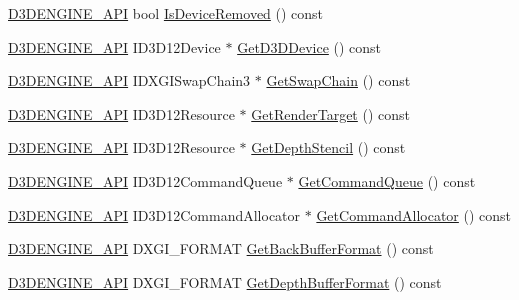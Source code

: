 \begin{DoxyCompactItemize}
\item 
\mbox{\hyperlink{stdafx_8h_a8ee2d990c5dfba7794dd2b60741d7722}{D3\+D\+E\+N\+G\+I\+N\+E\+\_\+\+A\+PI}} bool \mbox{\hyperlink{class_d_x_1_1_device_resources_ac6034a7660faea0d269dbb0d325cb7cd}{Is\+Device\+Removed}} () const
\item 
\mbox{\hyperlink{stdafx_8h_a8ee2d990c5dfba7794dd2b60741d7722}{D3\+D\+E\+N\+G\+I\+N\+E\+\_\+\+A\+PI}} I\+D3\+D12\+Device $\ast$ \mbox{\hyperlink{class_d_x_1_1_device_resources_ab453c5634e7cd987bee4a1819b78122a}{Get\+D3\+D\+Device}} () const
\item 
\mbox{\hyperlink{stdafx_8h_a8ee2d990c5dfba7794dd2b60741d7722}{D3\+D\+E\+N\+G\+I\+N\+E\+\_\+\+A\+PI}} I\+D\+X\+G\+I\+Swap\+Chain3 $\ast$ \mbox{\hyperlink{class_d_x_1_1_device_resources_a7a96c1ac092f671997e17f9078c409e3}{Get\+Swap\+Chain}} () const
\item 
\mbox{\hyperlink{stdafx_8h_a8ee2d990c5dfba7794dd2b60741d7722}{D3\+D\+E\+N\+G\+I\+N\+E\+\_\+\+A\+PI}} I\+D3\+D12\+Resource $\ast$ \mbox{\hyperlink{class_d_x_1_1_device_resources_a8dd65cfba90dd43be6b43328985d6f75}{Get\+Render\+Target}} () const
\item 
\mbox{\hyperlink{stdafx_8h_a8ee2d990c5dfba7794dd2b60741d7722}{D3\+D\+E\+N\+G\+I\+N\+E\+\_\+\+A\+PI}} I\+D3\+D12\+Resource $\ast$ \mbox{\hyperlink{class_d_x_1_1_device_resources_abb849df3775f377ef3e3625b5b43fa5b}{Get\+Depth\+Stencil}} () const
\item 
\mbox{\hyperlink{stdafx_8h_a8ee2d990c5dfba7794dd2b60741d7722}{D3\+D\+E\+N\+G\+I\+N\+E\+\_\+\+A\+PI}} I\+D3\+D12\+Command\+Queue $\ast$ \mbox{\hyperlink{class_d_x_1_1_device_resources_adabcf266dec101a537eebbce5f74cfdd}{Get\+Command\+Queue}} () const
\item 
\mbox{\hyperlink{stdafx_8h_a8ee2d990c5dfba7794dd2b60741d7722}{D3\+D\+E\+N\+G\+I\+N\+E\+\_\+\+A\+PI}} I\+D3\+D12\+Command\+Allocator $\ast$ \mbox{\hyperlink{class_d_x_1_1_device_resources_a416ba6505eff4048099366721ec9fc1d}{Get\+Command\+Allocator}} () const
\item 
\mbox{\hyperlink{stdafx_8h_a8ee2d990c5dfba7794dd2b60741d7722}{D3\+D\+E\+N\+G\+I\+N\+E\+\_\+\+A\+PI}} D\+X\+G\+I\+\_\+\+F\+O\+R\+M\+AT \mbox{\hyperlink{class_d_x_1_1_device_resources_aca67f798cb4669d889a24e48b1b53acc}{Get\+Back\+Buffer\+Format}} () const
\item 
\mbox{\hyperlink{stdafx_8h_a8ee2d990c5dfba7794dd2b60741d7722}{D3\+D\+E\+N\+G\+I\+N\+E\+\_\+\+A\+PI}} D\+X\+G\+I\+\_\+\+F\+O\+R\+M\+AT \mbox{\hyperlink{class_d_x_1_1_device_resources_a75ba016c43eba423ed0a6d9a3a60edf1}{Get\+Depth\+Buffer\+Format}} () const

\end{DoxyCompactItemize}
